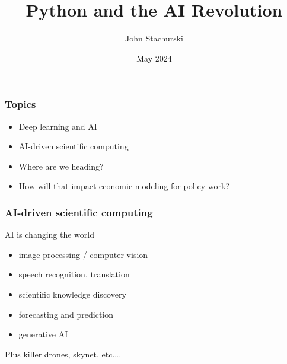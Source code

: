 \documentclass[
    xcolor={svgnames,dvipsnames},
    hyperref={colorlinks, citecolor=DeepPink4, linkcolor=DarkRed, urlcolor=DarkBlue}
    ]{beamer}  %
\title{Python and the AI Revolution}
\author{John Stachurski}
\date{May 2024}
\newcommand{\1}{\mathbbm 1}
\begin{document}
\begin{frame}
  \titlepage
\end{frame}







\begin{frame}
    \frametitle{Topics}

    \begin{itemize}
        \item Deep learning and AI
        \vspace{0.5em}
        \item AI-driven scientific computing
        \vspace{0.5em}
        \item Where are we heading?
        \vspace{0.5em}
        \item How will that impact economic modeling for policy work?
    \end{itemize}


\end{frame}



\begin{frame}
    \frametitle{AI-driven scientific computing}

    AI is changing the world

    \begin{itemize}
        \item image processing / computer vision
        \vspace{0.5em}
        \item speech recognition, translation
        \vspace{0.5em}
        \item scientific knowledge discovery
        \vspace{0.5em}
        \item forecasting and prediction 
        \vspace{0.5em}
        \item generative AI
    \end{itemize}

    \pause

        \vspace{0.5em}
        \vspace{0.5em}
        \vspace{0.5em}
    Plus killer drones, skynet, etc.\ldots

    
\end{frame}
\end{document}
